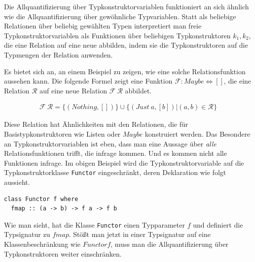 Die Allquantifizierung über Typkonstruktorvariablen funktioniert an sich ähnlich wie die Allquantifizierung über gewöhnliche
Typvariablen. Statt als beliebige Relationen über beliebig gewählten Typen interpretiert man freie Typkonstruktorvariablen als
Funktionen über beliebigen Typkonstruktoren $k_1, k_2$, die eine Relation auf eine neue abbilden, indem sie die Typkonstruktoren
auf die Typmengen der Relation anwenden.

Es bietet sich an, an einem Beispiel zu zeigen, wie eine solche Relationsfunktion aussehen kann. Die folgende Formel zeigt eine
Funktion $\mathcal{F} : Maybe \Leftrightarrow []$, die eine Relation $\mathcal{R}$ auf eine neue Relation
$\mathcal{F}~\mathcal{R}$ abbildet.

\begin{align*}
\mathcal{F}~\mathcal{R} = \{ (Nothing, []) \} \cup \{(Just\ a, [b]) | (a, b) \in \mathcal{R}\}
\end{align*}

Diese Relation hat Ähnlichkeiten mit den Relationen, die für Basistypkonstruktoren wie Listen oder $Maybe$ konstruiert
werden.
Das Besondere an Typkonstruktorvariablen ist eben, dass man eine Aussage über \textit{alle} Relationsfunktionen trifft,
die infrage kommen.
Und es kommen nicht alle Funktionen infrage. Im obigen Beispiel wird die Typkonstruktorvariable auf die Typkonstruktorklasse
\texttt{Functor} eingeschränkt, deren Deklaration wie folgt aussieht.

\begin{verbatim}
class Functor f where
  fmap :: (a -> b) -> f a -> f b
\end{verbatim}

Wie man sieht, hat die Klasse \texttt{Functor} einen Typparameter $f$ und definiert die Typsignatur zu $fmap$. Stößt man jetzt in
einer Typsignatur auf eine Klassenbeschränkung wie $Functor f$,
muss man die Allquantifizierung über Typkonstruktoren weiter einschränken.

